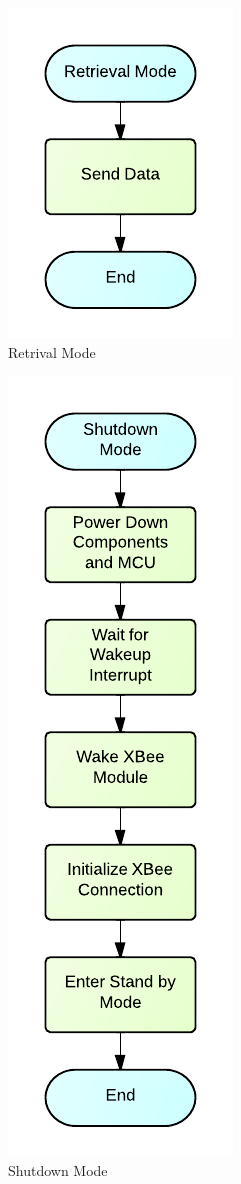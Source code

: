 \begin{figure}[H]
	\centering
	\includegraphics[scale=1.0]{img/RetrievalMode.pdf}
	\caption{Retrival Mode \label{fig:retrivalMode}}
\end{figure}

\begin{figure}[H]
	\centering
	\includegraphics[scale=1.0]{img/ShutdownMode.pdf}
	\caption{Shutdown Mode \label{fig:shutdownMode}}
\end{figure}

